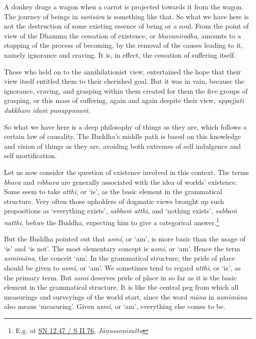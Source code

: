A donkey drags a wagon when a carrot is projected towards it from the wagon. The journey of beings in \emph{saṁsāra} is something like that. So what we have here is not the destruction of some existing essence of being or a soul. From the point of view of the Dhamma the cessation of existence, or \emph{bhavanirodha}, amounts to a stopping of the process of becoming, by the removal of the causes leading to it, namely ignorance and craving. It is, in effect, the cessation of suffering itself.

Those who held on to the annihilationist view, entertained the hope that their view itself entitled them to their cherished goal. But it was in vain, because the ignorance, craving, and grasping within them created for them the five groups of grasping, or this mass of suffering, again and again despite their view, \emph{uppajjati dukkham idaṁ punappunaṁ}.

So what we have here is a deep philosophy of things as they are, which follows a certain law of causality. The Buddha's middle path is based on this knowledge and vision of things as they are, avoiding both extremes of self indulgence and self mortification.

Let us now consider the question of existence involved in this context. The terms \emph{bhava} and \emph{vibhava} are generally associated with the idea of worlds' existence. Some seem to take \emph{atthi}, or `is', as the basic element in the grammatical structure. Very often those upholders of dogmatic views brought up such propositions as `everything exists', \emph{sabbaṁ atthi}, and `nothing exists', \emph{sabbaṁ natthi}, before the Buddha, expecting him to give a categorical answer.\footnote{E.g. at \href{https://suttacentral.net/sn12.47/pli/ms}{SN 12.47 / S II 76}, \emph{Jāṇussoṇisutta}}

But the Buddha pointed out that \emph{asmi}, or `am', is more basic than the usage of `is' and `is not'. The most elementary concept is \emph{asmi}, or `am'. Hence the term \emph{asmimāna}, the conceit `am'. In the grammatical structure, the pride of place should be given to \emph{asmi}, or `am'. We sometimes tend to regard \emph{atthi}, or `is', as the primary term. But \emph{asmi} deserves pride of place in so far as it is the basic element in the grammatical structure. It is like the central peg from which all measurings and surveyings of the world start, since the word \emph{māna} in \emph{asmimāna} also means `measuring'. Given \emph{asmi}, or `am', everything else comes to be.

